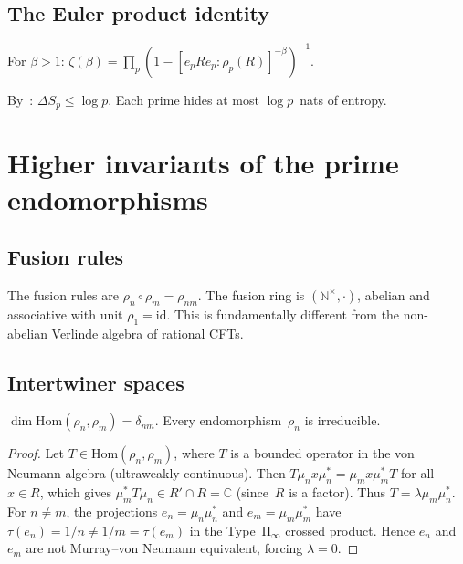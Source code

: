 \documentclass[aps,prl,twocolumn,superscriptaddress,showpacs]{revtex4-2}
\begin{document}
\subsection{The Euler product identity}

\begin{theorem}
For $\beta > 1$:
$\zeta(\beta) = \prod_p (1 - [e_p R e_p : \rho_p(R)]^{-\beta})^{-1}$.
\end{theorem}

\begin{corollary}
By~\cite{LongoWitten2022}: $\Delta S_p \leq \log p$. Each prime hides at most $\log p$~nats of entropy.
\end{corollary}

\section{Higher invariants of the prime endomorphisms}
\label{sec:higher}

\subsection{Fusion rules}

The fusion rules are $\rho_n \circ \rho_m = \rho_{nm}$. The fusion ring is $(\mathbb{N}^\times, \cdot)$, abelian and associative with unit $\rho_1 = \mathrm{id}$. This is fundamentally different from the non-abelian Verlinde algebra of rational CFTs.

\subsection{Intertwiner spaces}

\begin{theorem}
\label{thm:intertwiners}
$\dim \mathrm{Hom}(\rho_n, \rho_m) = \delta_{nm}$. Every endomorphism~$\rho_n$ is irreducible.
\end{theorem}

\begin{proof}
Let $T \in \mathrm{Hom}(\rho_n, \rho_m)$, where $T$ is a bounded operator in the von Neumann algebra (ultraweakly continuous). Then $T\mu_n x \mu_n^* = \mu_m x \mu_m^* T$ for all $x \in R$, which gives $\mu_m^* T \mu_n \in R' \cap R = \mathbb{C}$ (since~$R$ is a factor). Thus $T = \lambda \mu_m \mu_n^*$. For $n \neq m$, the projections $e_n = \mu_n\mu_n^*$ and $e_m = \mu_m\mu_m^*$ have $\tau(e_n) = 1/n \neq 1/m = \tau(e_m)$ in the Type~II$_\infty$ crossed product. Hence $e_n$ and $e_m$ are not Murray--von Neumann equivalent, forcing $\lambda = 0$.
\end{proof}
\end{document}

